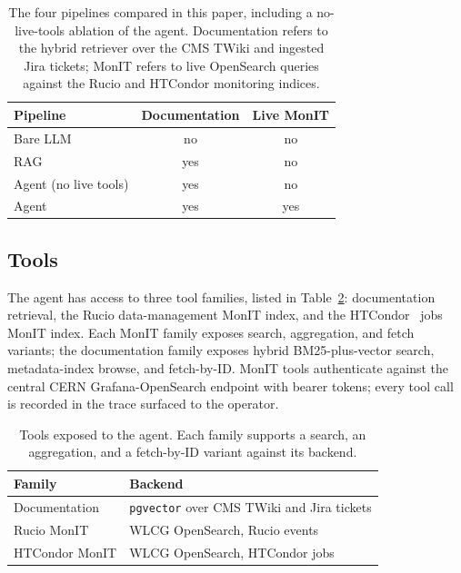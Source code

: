\begin{table}[htbp]
\centering
\caption{The four pipelines compared in this paper, including a
no-live-tools ablation of the agent. Documentation refers to the
hybrid retriever over the CMS TWiki and ingested Jira tickets;
MonIT refers to live OpenSearch queries against the Rucio and
HTCondor monitoring indices.}
\label{tab:pipeline_summary}
\begin{tabular}{lcc}
\toprule
\textbf{Pipeline} & \textbf{Documentation} & \textbf{Live MonIT} \\
\midrule
Bare LLM               & no  & no  \\
RAG                    & yes & no  \\
Agent (no live tools)  & yes & no  \\
Agent                  & yes & yes \\
\bottomrule
\end{tabular}
\end{table}

\subsection{Tools}
\label{sec:tools}

The agent has access to three tool families, listed in
Table~\ref{tab:tool_catalogue}: documentation retrieval, the
Rucio data-management MonIT index, and the
HTCondor~\cite{htcondor2005} jobs MonIT index. Each MonIT family
exposes search, aggregation, and fetch variants; the documentation
family exposes hybrid BM25-plus-vector search, metadata-index
browse, and fetch-by-ID. MonIT tools authenticate against the
central CERN Grafana-OpenSearch endpoint with bearer tokens; every
tool call is recorded in the trace surfaced to the operator.

\begin{table}[htbp]
\centering
\caption{Tools exposed to the agent. Each family supports a
search, an aggregation, and a fetch-by-ID variant against its
backend.}
\label{tab:tool_catalogue}
\begin{tabular}{@{}lp{}@{}}
\toprule
\textbf{Family} & \textbf{Backend} \\
\midrule
Documentation  & \texttt{pgvector} over CMS TWiki and Jira tickets \\
Rucio MonIT    & WLCG OpenSearch, Rucio events \\
HTCondor MonIT & WLCG OpenSearch, HTCondor jobs \\
\bottomrule
\end{tabular}
\end{table}

